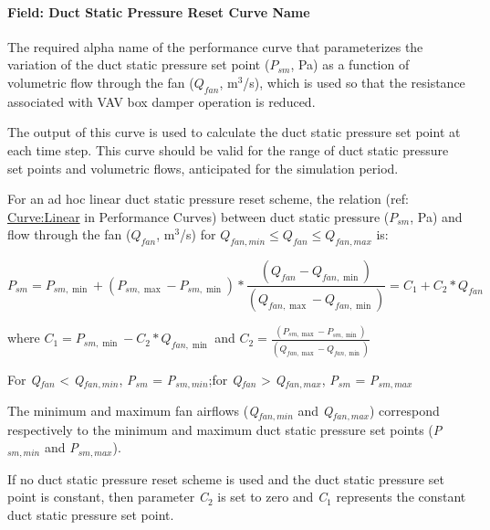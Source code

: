 \paragraph{Field: Duct Static Pressure Reset Curve Name}\label{field-duct-static-pressure-reset-curve-name}

The required alpha name of the performance curve that parameterizes the variation of the duct static pressure set point (\(P_{sm}\), Pa) as a function of volumetric flow through the fan (\(Q_{fan}\), m\(^{3}\)/s), which is used so that the resistance associated with VAV box damper operation is reduced.

The output of this curve is used to calculate the duct static pressure set point at each time step. This curve should be valid for the range of duct static pressure set points and volumetric flows, anticipated for the simulation period.

For an ad hoc linear duct static pressure reset scheme, the relation (ref: \hyperref[curvelinear]{Curve:Linear} in Performance Curves) between duct static pressure (\(P_{sm}\), Pa) and flow through the fan (\(Q_{fan}\), m\(^{3}\)/s) for \(Q_{fan,min} \le Q_{fan} \le Q_{fan,max}\) is:

\begin{equation}
P_{sm} = P_{sm,\min } + \left( P_{sm,\max } - P_{sm,\min } \right) * \frac{{\left( {{Q_{fan}} - {Q_{fan,\min }}} \right)}}{{\left( {{Q_{fan,\max }} - {Q_{fan,\min }}} \right)}} = {C_1} + {C_2}*{Q_{fan}}
\end{equation}

where \({C_1} = {P_{sm,\min }} - {C_2}*{Q_{fan,\min }}\) and \({C_2} = \frac{{\left( {{P_{sm,\max }} - {P_{sm,\min }}} \right)}}{{\left( {{Q_{fan,\max }} - {Q_{fan,\min }}} \right)}}\)

For \emph{Q\(_{fan}\)} \textless{} \emph{Q\(_{fan,min}\)}, \emph{P\(_{sm}\)} = \emph{P\(_{sm,min}\)};for \emph{Q\(_{fan}\)} \textgreater{} \emph{Q\(_{fan,max}\)}, \emph{P\(_{sm}\)} = \emph{P\(_{sm,max}\)}

The minimum and maximum fan airflows (\emph{Q\(_{fan,min}\)} and \emph{Q\(_{fan,max}\)}) correspond respectively to the minimum and maximum duct static pressure set points (\emph{P\(_{sm,min}\)} and \emph{P\(_{sm,max}\)}).

If no duct static pressure reset scheme is used and the duct static pressure set point is constant, then parameter \emph{C\(_{2}\)} is set to zero and \emph{C\(_{1}\)} represents the constant duct static pressure set point.

